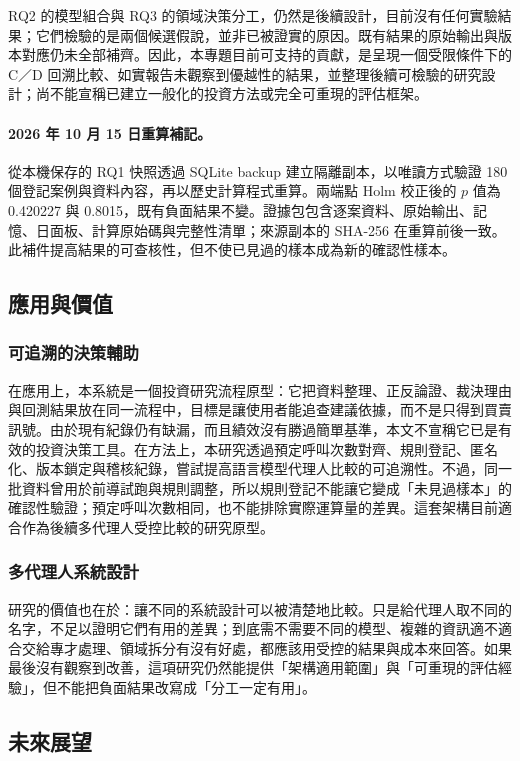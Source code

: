 RQ2 的模型組合與 RQ3 的領域決策分工，仍然是後續設計，目前沒有任何實驗結果；它們檢驗的是兩個候選假說，並非已被證實的原因。既有結果的原始輸出與版本對應仍未全部補齊。因此，本專題目前可支持的貢獻，是呈現一個受限條件下的 C／D 回溯比較、如實報告未觀察到優越性的結果，並整理後續可檢驗的研究設計；尚不能宣稱已建立一般化的投資方法或完全可重現的評估框架。

\paragraph{2026 年 10 月 15 日重算補記。} 從本機保存的 RQ1 快照透過 SQLite backup 建立隔離副本，以唯讀方式驗證 180 個登記案例與資料內容，再以歷史計算程式重算。兩端點 Holm 校正後的 $p$ 值為 0.420227 與 0.8015，既有負面結果不變。證據包包含逐案資料、原始輸出、記憶、日面板、計算原始碼與完整性清單；來源副本的 SHA-256 在重算前後一致。此補件提高結果的可查核性，但不使已見過的樣本成為新的確認性樣本。

\subsection{應用與價值}

\subsubsection{可追溯的決策輔助}
在應用上，本系統是一個投資研究流程原型：它把資料整理、正反論證、裁決理由與回測結果放在同一流程中，目標是讓使用者能追查建議依據，而不是只得到買賣訊號。由於現有紀錄仍有缺漏，而且績效沒有勝過簡單基準，本文不宣稱它已是有效的投資決策工具。在方法上，本研究透過預定呼叫次數對齊、規則登記、匿名化、版本鎖定與稽核紀錄，嘗試提高語言模型代理人比較的可追溯性。不過，同一批資料曾用於前導試跑與規則調整，所以規則登記不能讓它變成「未見過樣本」的確認性驗證；預定呼叫次數相同，也不能排除實際運算量的差異。這套架構目前適合作為後續多代理人受控比較的研究原型。
\subsubsection{多代理人系統設計}

研究的價值也在於：讓不同的系統設計可以被清楚地比較。只是給代理人取不同的名字，不足以證明它們有用的差異；到底需不需要不同的模型、複雜的資訊適不適合交給專才處理、領域拆分有沒有好處，都應該用受控的結果與成本來回答。如果最後沒有觀察到改善，這項研究仍然能提供「架構適用範圍」與「可重現的評估經驗」，但不能把負面結果改寫成「分工一定有用」。

\subsection{未來展望}


